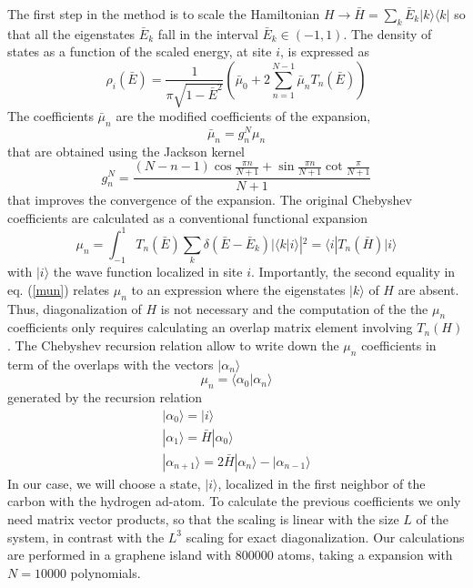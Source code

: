 \documentclass[aps,prb,twocolumn,superscriptaddress]{revtex4-1}
\newcommand{\ket}[1]{|#1\rangle}
\newcommand{\bra}[1]{\langle#1|}
\newcommand{\braket}[2]{\langle#1|#2\rangle}
\begin{document}
The first step in the method is to  scale the Hamiltonian $H \rightarrow \bar H=\sum_k\bar E_k \ket{k}\bra{k}$
so that all the eigenstates $\bar E_k$ fall in the interval $\bar E_k \in (-1,1)$.  The density of states as a function of the scaled energy, at site $i$,  is expressed as
\begin{equation}
\rho_i(\bar E) = \frac{1}{\pi \sqrt{1-\bar E^2}}
\left (\bar \mu_0 + 2 \sum^{N-1}_{n=1} \bar \mu_n T_n (\bar E)
\right )
\label{KPM}
\end{equation}
The coefficients $\bar \mu_n$ are
the modified coefficients of the expansion,
\begin{equation}
\bar \mu_n = g^N_n \mu_n
\end{equation}
that are obtained using the Jackson kernel\cite{jackson1912approximation}
\begin{equation}
g_n^N =
\frac{(N-n-1)\cos \frac{\pi n}{N+1} + \sin \frac{\pi n}{N+1}
\cot \frac{\pi }{N+1}}{N+1}
\end{equation}
that improves the convergence of the expansion. The original
Chebyshev coefficients are calculated as a conventional
functional expansion
\begin{equation}
\mu_n = \int_{-1}^{1} T_n(\bar E) \sum_k \delta (\bar E-\bar E_k) |\langle k | i \rangle |^2
= \langle i | T_n(\bar H) | i \rangle
\label{mun}
\end{equation}
with $| i \rangle$ the wave function localized in site $i$. Importantly, the
second equality in eq. (\ref{mun}) relates $\mu_n$ to an expression where the
eigenstates $|k\rangle$ of $H$ are absent. Thus, diagonalization of $H$ is not
necessary and  the computation of the the $\mu_n$ coefficients only requires
calculating an overlap matrix element involving $T_n(H)$.
The Chebyshev recursion relation allow to write down the $\mu_n$ coefficients in term of the overlaps with the vectors $\ket{\alpha_n}$
\begin{equation}
\mu_n =
\braket{\alpha_0}{\alpha_n}%
\end{equation}
generated by the recursion relation
\begin{equation}
\begin{aligned}
\ket{\alpha_0} = \ket{i}  \\  %
\ket{\alpha_1} = \bar{H} \ket{\alpha_0} \\
\ket{\alpha_{n+1}} = 2\bar{H} \ket{\alpha_n}- \ket{\alpha_{n-1}}
\end{aligned}
\end{equation}
In our case, we will choose a state, $\ket{i}$, localized in the first neighbor
of the carbon with the hydrogen ad-atom.
To calculate the previous coefficients we only need matrix vector products,
so that the scaling is linear with the size $L$ of the system, in contrast with
the $L^3$ scaling for exact diagonalization.
Our calculations are performed in a graphene island with 800000 atoms,
taking a expansion with $N=10000$ polynomials.
\end{document}
